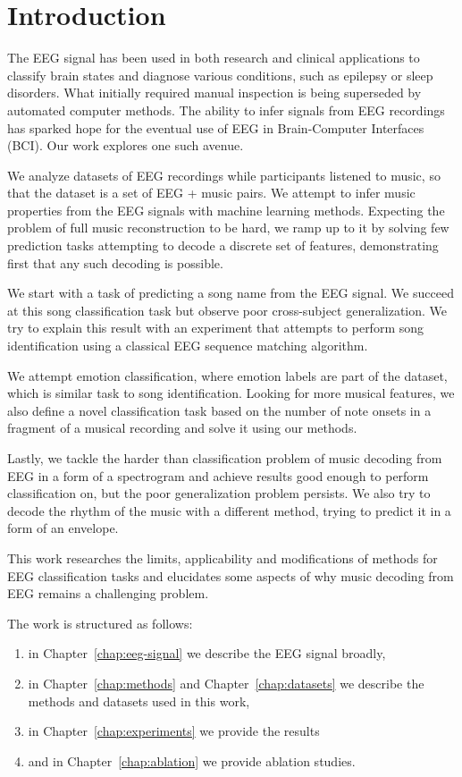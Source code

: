 \chapter{Introduction}

The EEG signal has been used in both research and clinical applications to classify brain states and diagnose various conditions, such as epilepsy or sleep disorders\cite{jain}.
What initially required manual inspection is being superseded by automated computer methods.
The ability to infer signals from EEG recordings has sparked hope for the eventual use of EEG in Brain-Computer Interfaces (BCI).
Our work explores one such avenue.

We analyze datasets of EEG recordings while participants listened to music, so that the dataset is a set of EEG + music pairs.
We attempt to infer music properties from the EEG signals with machine learning methods.
Expecting the problem of full music reconstruction to be hard, we ramp up to it by solving few prediction tasks attempting to decode a discrete set of features, demonstrating first that any such decoding is possible.

We start with a task of predicting a song name from the EEG signal.
We succeed at this song classification task but observe poor cross-subject generalization.
We try to explain this result with an experiment that attempts to perform song identification using a classical EEG sequence matching algorithm.

We attempt emotion classification, where emotion labels are part of the dataset, which is similar task to song identification. 
Looking for more musical features,
we also define a novel classification task based on the number of note onsets in a fragment of a musical recording and solve it using our methods.

Lastly, we tackle the harder than classification problem of music decoding from EEG in a form of a spectrogram and achieve results good enough to perform classification on, but the poor generalization problem persists.
We also try to decode the rhythm of the music with a different method, trying to predict it in a form of an envelope.

This work researches the limits, applicability and modifications of methods for EEG classification tasks and elucidates some aspects of why music decoding from EEG remains a challenging problem.

The work is structured as follows:
\begin{enumerate}
    \item in Chapter~\ref{chap:eeg-signal} we describe the EEG signal broadly,
    \item in Chapter~\ref{chap:methods} and Chapter~\ref{chap:datasets} we describe the methods and datasets used in this work,
    \item in Chapter~\ref{chap:experiments} we provide the results
    \item and in Chapter~\ref{chap:ablation} we provide ablation studies.
\end{enumerate}